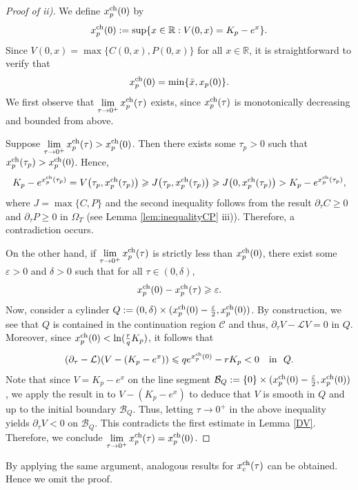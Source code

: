 \documentclass[11pt, a4paper, leqno]{amsart}
\numberwithin{equation}{section}
\theoremstyle{plain}
\theoremstyle{definition}
\theoremstyle{remark}
\def\le{\leqslant}
\def\ge{\geqslant}
\def\geq{\geqslant}
\begin{document}
\begin{proof}[Proof of ii)]
We define $x_p^{\rm ch}(0)$ by
\[x_p^{\rm ch}(0) := \sup\{x \in \mathbb{R} : V(0,x) = K_p - e^x \}.\]
Since $V(0,x) = \max\{C(0,x), P(0,x)\}$ for all $x \in \mathbb{R}$, it is straightforward to verify that
\[x_p^{\rm ch}(0) = \min\{\bar{x}, x_p(0)\}.\]
We first observe that $\displaystyle\lim_{\tau \to 0^+} x_p^{\rm ch}(\tau)$ exists, since $x_p^{\rm ch}(\tau)$ is monotonically decreasing and bounded from above.

Suppose $\displaystyle{\lim_{\tau \to 0^+}x_p^{\rm ch}(\tau)}
> x_p^{\rm ch}(0)$.
Then there exists some $\tau_p>0$ such that
$x_p^{\rm ch}(\tau_p)>x_p^{\rm ch}(0)$.
Hence,
\[
K_p - e^{x_p^{\rm ch}(\tau_p)}
= V\big(\tau_p, x_p^{\rm ch}(\tau_p)\big)
\ge J\big(\tau_p, x_p^{\rm ch}(\tau_p)\big)
\ge J\big(0, x_p^{\rm ch}(\tau_p)\big)
> K_p - e^{x_p^{\rm ch}(\tau_p)},
\]
where $J=\max\{C,P\}$ and the second inequality follows from the result
$\partial_\tau C \geq 0$ and $\partial_\tau P \geq 0$ in $\Omega_T$
(see Lemma \ref{lem:inequalityCP} iii)).
Therefore, a contradiction occurs.

On the other hand, if $\displaystyle{\lim_{\tau \to 0^+}x_p^{\rm ch}(\tau)}$ 
is strictly less than $x_p^{\rm ch}(0)$,
there exist some $\varepsilon>0$ and $\delta>0$ such that
for all $\tau\in(0,\delta)$,
\[x^{\rm ch}_p(0)-x^{\rm ch}_p(\tau)\ge \varepsilon.
\]
Now, consider a cylinder $Q:=(0,\delta)\times(x^{\rm ch}_p(0)-\frac{\varepsilon}{2}, x^{\rm ch}_p(0))$.
By construction, we see that $Q$ is contained in the continuation region $\mathcal{C}$ and thus, $\partial_\tau V -\mathcal{L}V=0$ in $Q$.
Moreover, since $x^{\rm ch}_p(0) < \ln({\frac{r}{q}}K_p)$,
it follows that
\[(\partial_\tau-\mathcal{L})(V-(K_p-e^x))
\le qe^{x^{\rm ch}_p(0)}-rK_p
< 0 \quad \text{in}\ \ Q.
\]
Note that since $V=K_p-e^x$ on the line segment
$\mathcal{B}_Q:=\{0\}\times(x^{\rm ch}_p(0)-\frac{\varepsilon}{2}, x^{\rm ch}_p(0))$,
we apply the result in \cite[Theorem 19, p.~321]{FRI64} to $V-(K_p-e^x)$ to deduce that $V$ is smooth in $Q$ and up to the initial boundary $\mathcal{B}_Q$.
Thus, letting $\tau\to0^+$ in the above inequality yields
$\partial_\tau V<0$ on $\mathcal B_Q$.
This contradicts the first estimate in Lemma \ref{DV}.
Therefore, we conclude $\displaystyle{\lim_{\tau \to 0^+}x_p^{\rm ch}(\tau)}=x_p^{\rm ch}(0)$.
\end{proof}

By applying the same argument, analogous  results for  $x_c^{\rm ch}(\tau)$ can be obtained. Hence we omit the proof.
\end{document}
